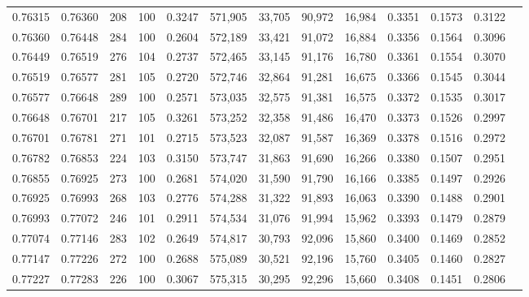 \begin{tabular}{rrrrrrrrrrrrr}
0.76315 & 0.76360 &   208 & 100 &                                     0.3247 & 571,905 &  33,705 &  90,972 &  16,984 & 0.3351 & 0.1573 & 0.3122 \\
0.76360 & 0.76448 &   284 & 100 &                                     0.2604 & 572,189 &  33,421 &  91,072 &  16,884 & 0.3356 & 0.1564 & 0.3096 \\
0.76449 & 0.76519 &   276 & 104 &                                     0.2737 & 572,465 &  33,145 &  91,176 &  16,780 & 0.3361 & 0.1554 & 0.3070 \\
0.76519 & 0.76577 &   281 & 105 &                                     0.2720 & 572,746 &  32,864 &  91,281 &  16,675 & 0.3366 & 0.1545 & 0.3044 \\
0.76577 & 0.76648 &   289 & 100 &                                     0.2571 & 573,035 &  32,575 &  91,381 &  16,575 & 0.3372 & 0.1535 & 0.3017 \\
0.76648 & 0.76701 &   217 & 105 &                                     0.3261 & 573,252 &  32,358 &  91,486 &  16,470 & 0.3373 & 0.1526 & 0.2997 \\
0.76701 & 0.76781 &   271 & 101 &                                     0.2715 & 573,523 &  32,087 &  91,587 &  16,369 & 0.3378 & 0.1516 & 0.2972 \\
0.76782 & 0.76853 &   224 & 103 &                                     0.3150 & 573,747 &  31,863 &  91,690 &  16,266 & 0.3380 & 0.1507 & 0.2951 \\
0.76855 & 0.76925 &   273 & 100 &                                     0.2681 & 574,020 &  31,590 &  91,790 &  16,166 & 0.3385 & 0.1497 & 0.2926 \\
0.76925 & 0.76993 &   268 & 103 &                                     0.2776 & 574,288 &  31,322 &  91,893 &  16,063 & 0.3390 & 0.1488 & 0.2901 \\
0.76993 & 0.77072 &   246 & 101 &                                     0.2911 & 574,534 &  31,076 &  91,994 &  15,962 & 0.3393 & 0.1479 & 0.2879 \\
0.77074 & 0.77146 &   283 & 102 &                                     0.2649 & 574,817 &  30,793 &  92,096 &  15,860 & 0.3400 & 0.1469 & 0.2852 \\
0.77147 & 0.77226 &   272 & 100 &                                     0.2688 & 575,089 &  30,521 &  92,196 &  15,760 & 0.3405 & 0.1460 & 0.2827 \\
0.77227 & 0.77283 &   226 & 100 &                                     0.3067 & 575,315 &  30,295 &  92,296 &  15,660 & 0.3408 & 0.1451 & 0.2806 \\

\end{tabular}

